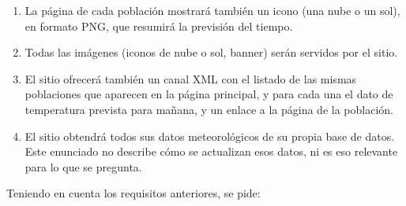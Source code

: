 \begin{enumerate}
\item La página de cada población mostrará también un icono (una nube o un sol), en formato PNG, que resumirá la previsión del tiempo.

\item Todas las imágenes (iconos de nube o sol, banner) serán servidos por el sitio.

\item El sitio ofrecerá también un canal XML con el listado de las mismas poblaciones que aparecen en la página principal, y para cada una el dato de temperatura prevista para mañana, y un enlace a la página de la población.
  
\item El sitio obtendrá todos sus datos meteorológicos de su propia base de datos. Este enunciado no describe cómo se actualizan esos datos, ni es eso relevante para lo que se pregunta.
\end{enumerate}


Teniendo en cuenta los requisitos anteriores, se pide:

